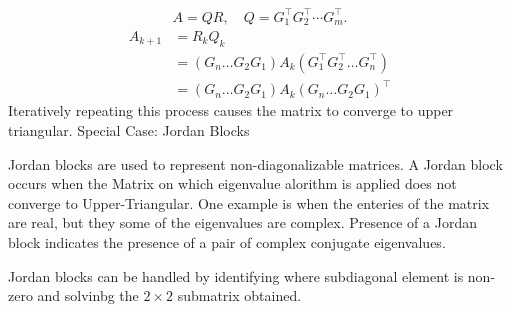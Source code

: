 \documentclass[journal]{IEEEtran}
\begin{document}
\begin{align}
A = Q R, \quad Q = G_1^{\top} G_2^{\top} \cdots G_m^{\top}.
\end{align}
\begin{align}
    A_{k+1}&= R_k Q_k\\
    &=(G_n \dots G_2 G_1)A_k(G_1^{\top}G_2^{\top}\dots G_n^{\top})\\
    &= (G_n \dots G_2 G_1)A_k(G_n \dots G_2 G_1)^{\top}
\end{align}
Iteratively repeating this process causes the matrix to converge to upper triangular.\newline
Special Case: Jordan Blocks \newline

Jordan blocks are used to represent non-diagonalizable matrices. A Jordan block occurs when the Matrix on which eigenvalue alorithm is applied does not converge to Upper-Triangular. One example is when the enteries of the matrix are real, but they some of the eigenvalues are complex. Presence of a Jordan block indicates the presence of a pair of complex conjugate eigenvalues. 
\begin{center}
\end{center}
Jordan blocks can be handled by identifying where subdiagonal element is non-zero and solvinbg the $2 \times 2$ submatrix obtained.
\end{document}
